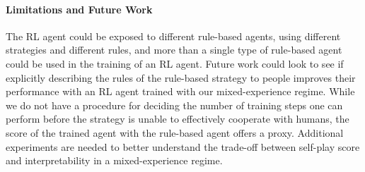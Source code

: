 \documentclass[letterpaper]{article} %
\begin{document}
\paragraph{Limitations and Future Work}





The RL agent could be exposed to different rule-based agents, using different strategies and different rules, and more than a single type of rule-based agent could be used in the training of an RL agent.
Future work could look to see if explicitly describing  the rules of the rule-based strategy to people  improves their performance with an RL agent trained with our mixed-experience regime.
While we do not have a procedure for deciding the number of training steps one can perform before the strategy is unable to effectively cooperate with humans, the score of the trained agent with the rule-based agent offers a proxy. %
Additional experiments are needed to better understand the trade-off between self-play score and interpretability in a mixed-experience regime.
\end{document}
